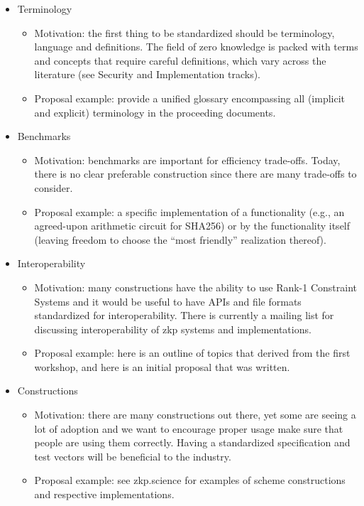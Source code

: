 \documentclass{article}
\begin{document}
\begin{itemize}
	\item Terminology
		\begin{itemize}
			\item Motivation: the first thing to be standardized should be terminology, language and definitions. The field of zero knowledge is packed with terms and concepts that require careful definitions, which vary across the literature (see Security and Implementation tracks).
        	\item Proposal example: provide a unified glossary encompassing all (implicit and explicit) terminology in the proceeding documents.
        \end{itemize}
    \item Benchmarks
        \begin{itemize}
        	\item Motivation: benchmarks are important for efficiency trade-offs. Today, there is no clear preferable construction since there are many trade-offs to consider.
        	\item Proposal example: a specific implementation of a functionality (e.g., an agreed-upon arithmetic circuit for SHA256) or by the functionality itself (leaving freedom to choose the “most friendly” realization thereof).
        \end{itemize}
    \item Interoperability
        \begin{itemize}
        	\item Motivation: many constructions have the ability to use Rank-1 Constraint Systems and it would be useful to have APIs and file formats standardized for interoperability. There is currently a mailing list for discussing interoperability of zkp systems and implementations.
        	\item Proposal example: here is an outline of topics that derived from the first workshop, and here is an initial proposal that was written.
        \end{itemize}
   \item Constructions
		\begin{itemize}
			\item Motivation: there are many constructions out there, yet some are seeing a lot of adoption and we want to encourage proper usage make sure that people are using them correctly. Having a standardized specification and test vectors will be beneficial to the industry.
        	\item Proposal example: see zkp.science for examples of scheme constructions and respective implementations.

\end{itemize}
\end{itemize}
\end{document}
